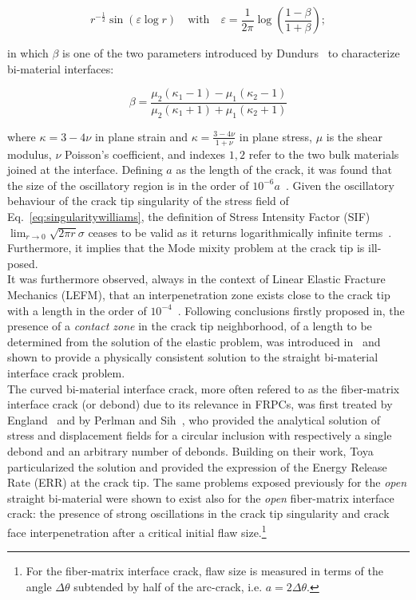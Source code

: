 \begin{equation}\label{eq:singularitywilliams}
r^{-\frac{1}{2}}\sin\left(\varepsilon\log r\right)\quad\text{with}\quad\varepsilon=\frac{1}{2\pi}\log\left(\frac{1-\beta}{1+\beta}\right);
\end{equation}

in which $\beta$ is one of the two parameters introduced by Dundurs~\cite{Dundurs1969} to characterize bi-material interfaces:

\begin{equation}\label{eq:dundursbeta}
\beta=\frac{\mu_{2}\left(\kappa_{1}-1\right)-\mu_{1}\left(\kappa_{2}-1\right)}{\mu_{2}\left(\kappa_{1}+1\right)+\mu_{1}\left(\kappa_{2}+1\right)}
\end{equation}

where $\kappa=3-4\nu$ in plane strain and $\kappa=\frac{3-4\nu}{1+\nu}$ in plane stress, $\mu$ is the shear modulus, $\nu$ Poisson's coefficient, and indexes $1,2$ refer to the two bulk materials joined at the interface. Defining $a$ as the length of the crack, it was found that the size of the oscillatory region is in the order of $10^{-6}a$~\cite{Erdogan1963}. Given the oscillatory behaviour of the crack tip singularity of the stress field of Eq.~\ref{eq:singularitywilliams}, the definition of Stress Intensity Factor (SIF) $\lim_{r\rightarrow 0}\sqrt{2\pi r}\sigma$ ceases to be valid as it returns logarithmically infinite terms~\cite{Comninou1990}. Furthermore, it implies that the Mode mixity problem at the crack tip is ill-posed.\\
It was furthermore observed, always in the context of Linear Elastic Fracture Mechanics (LEFM), that an interpenetration zone exists close to the crack tip~\cite{England1965,Malyshev1965} with a length in the order of $10^{-4}$~\cite{England1965}. Following conclusions firstly proposed in\cite{Malyshev1965}, the presence of a \emph{contact zone} in the crack tip neighborhood, of a length to be determined from the solution of the elastic problem, was introduced in~\cite{Comninou1977} and shown to provide a physically consistent solution to the straight bi-material interface crack problem.\\
The curved bi-material interface crack, more often refered to as the fiber-matrix interface crack (or debond) due to its relevance in FRPCs, was first treated by England~\cite{England1966} and by Perlman and Sih~\cite{Perlman1967}, who provided the analytical solution of stress and displacement fields for a circular inclusion with respectively a single debond and an arbitrary number of debonds. Building on their work, Toya~\cite{Toya1974} particularized the solution and provided the expression of the Energy Release Rate (ERR) at the crack  tip. The same problems exposed previously for the \emph{open} straight bi-material were shown to exist also for the \emph{open} fiber-matrix interface crack: the presence of strong oscillations in the crack tip singularity and crack face interpenetration after a critical initial flaw size.\footnote{For the fiber-matrix interface crack, flaw size is measured in terms of the angle $\Delta\theta$ subtended by half of the arc-crack, i.e. $a=2\Delta\theta$.}\\
